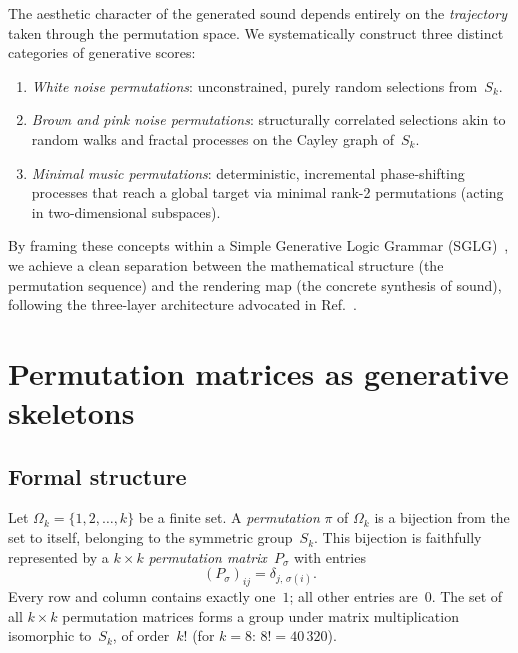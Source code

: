 \documentclass[
  twocolumn,
  aps,
  pra,
  showkeys,
  amsmath,amssymb,
  longbibliography
]{revtex4-2}
\begin{document}
The aesthetic character of the generated sound depends
entirely on the \emph{trajectory} taken through the
permutation space.
We systematically construct three distinct categories of
generative scores:
\begin{enumerate}
\item \emph{White noise permutations}: unconstrained, purely
      random selections from~$S_k$.
\item \emph{Brown and pink noise permutations}: structurally
      correlated selections akin to random walks and fractal
      processes on the Cayley graph of~$S_k$.
\item \emph{Minimal music permutations}: deterministic,
      incremental phase-shifting processes that reach a global
      target via minimal rank-2 permutations (acting in
      two-dimensional subspaces).
\end{enumerate}

By framing these concepts within a Simple Generative Logic
Grammar (SGLG)~\cite{Jendreiko2025}, we achieve a clean
separation between the mathematical structure (the permutation
sequence) and the rendering map (the concrete synthesis of
sound), following the three-layer architecture advocated in
Ref.~\cite{jendreiko-svozil-2026}.

\section{Permutation matrices as generative skeletons}
\label{sec:perm}

\subsection{Formal structure}

Let $\Omega_k=\{1,2,\ldots,k\}$ be a finite set.
A \emph{permutation} $\pi$ of $\Omega_k$ is a bijection from
the set to itself, belonging to the symmetric group~$S_k$.
This bijection is faithfully represented by a $k\times k$
\emph{permutation matrix}~$P_\sigma$ with entries
\begin{equation}
(P_\sigma)_{ij} = \delta_{j,\,\sigma(i)}.
\label{eq:permmat}
\end{equation}
Every row and column contains exactly one~$1$; all other
entries are~$0$.
The set of all $k\times k$ permutation matrices forms a group
under matrix multiplication isomorphic to~$S_k$, of
order~$k!$ (for $k=8$: $8!=40\,320$).
\end{document}
